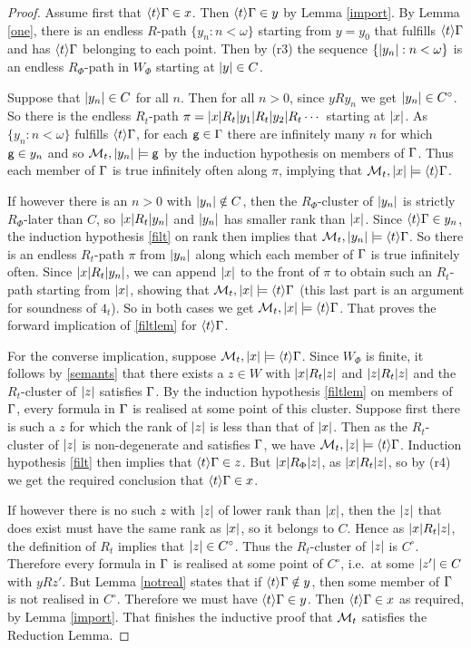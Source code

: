 \begin{proof}
Assume first that $\langle t\rangle\Gamma\in x$. Then $\langle t\rangle\Gamma\in y$ by Lemma \ref{import}. By Lemma \ref{one}, there is an endless $R$-path $\{y_n:n<\omega\}$ starting from $y=y_0$ that fulfills $\langle t\rangle\Gamma$ and has $\langle t\rangle\Gamma$ belonging to each point. Then by (r3) the sequence 
$\{|y_n|:n<\omega\}$ is an endless $R_\Phi$-path in $W_\Phi$ starting at $|y|\in C$.

Suppose that $|y_n|\in C$ for all $n$. Then for all $n>0$, since $yRy_n$ we get $|y_n|\in C^\circ$. So there is the endless $R_t$-path $\pi=|x|R_t|y_1|R_t|y_2|R_t\cdots$  starting at $|x|$.
As $\{y_n:n<\omega\}$ fulfills $\langle t\rangle\Gamma$, for each ${\sf g}\in\Gamma$ there are infinitely many $n$ for which ${\sf g}\in y_n$  and so $\mathcal{M}_t,|y_n|\models{\sf g}$ by the induction hypothesis on members of $\Gamma$. Thus each member of $\Gamma$ is true  infinitely often along $\pi$, implying that $\mathcal{M}_t,|x|\models \langle t\rangle\Gamma$.

If however there is an $n>0$ with $|y_n|\notin C$, then the $R_\Phi$-cluster of $|y_n|$ is strictly $R_\Phi$-later than $C$, so $|x|R_t|y_n|$ and $|y_n|$ has smaller rank than $|x|$. Since $\langle t\rangle\Gamma\in y_n$, the induction hypothesis \eqref{filt} on rank then implies that $\mathcal{M}_t,|y_n|\models \langle t\rangle\Gamma$. So there is an endless $R_t$-path $\pi$ from $|y_n|$ along which each member of $\Gamma$ is true infinitely often. Since $|x|R_t|y_n|$, we can append $|x|$ to the front of $\pi$ to obtain such an $R_t$-path starting from $|x|$, showing that $\mathcal{M}_t,|x|\models \langle t\rangle\Gamma$ (this last part is an argument for soundness of  $4_t$). So in both cases we get
$\mathcal{M}_t,|x|\models \langle t\rangle\Gamma$. That proves the forward implication of \eqref{filtlem} for $\langle t\rangle\Gamma$.

For the converse implication, suppose $\mathcal{M}_t,|x|\models \langle t\rangle\Gamma$. Since $W_\Phi$ is finite, it follows by \eqref{semants}  that there exists  a $z\in W$ with $|x|R_t|z|$ and $|z|R_t|z|$ and the $R_t$-cluster of $|z|$ satisfies $\Gamma$.
By the induction hypothesis \eqref{filtlem} on members of $\Gamma$,
every formula in $\Gamma$  is  realised at some point of this cluster.
Suppose first there is such a $z$ for which the rank of $|z|$ is less than that of $|x|$. Then  as the $R_t$-cluster of $|z|$ is non-degenerate and satisfies $\Gamma$, we have $\mathcal{M}_t,|z|\models \langle t\rangle\Gamma$. Induction hypothesis \eqref{filt} then implies that $\langle t\rangle\Gamma\in z$. But  $|x|R_\Phi|z|$, as $|x|R_t|z|$, so by (r4) we get the required conclusion that  $\langle t\rangle\Gamma\in x$.

If however there is no such $z$ with $|z|$ of lower rank  than $|x|$, then the $|z|$ that does exist must have the same rank as $|x|$, so it belongs  to $C$. Hence as  $|x|R_t|z|$, the definition of $R_t$ implies that $|z|\in C^\circ$.      
Thus  the $R_t$-cluster of $|z|$ is $C^\circ$. Therefore every formula in $\Gamma$  is  realised at some point of $C^\circ$, i.e.\ at some $|z'|\in C$ with $yRz'$. But Lemma \ref{notreal} states that if $\langle t\rangle\Gamma\notin y$, then some member of $\Gamma$ is not realised in $C^\circ$. Therefore we must have  $\langle t\rangle\Gamma\in y$. Then  $\langle t\rangle\Gamma\in x$ as required, by Lemma \ref{import}.
That finishes the inductive proof that $\mathcal{M}_t$ satisfies the Reduction Lemma. 
\end{proof}


